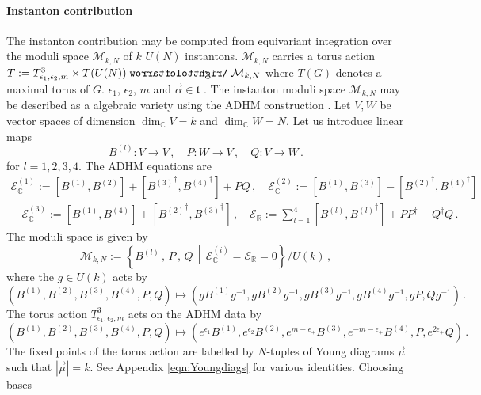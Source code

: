\documentclass[main.tex]{subfiles}
\begin{document}
\paragraph{Instanton contribution}
The instanton contribution may be computed from equivariant integration over the moduli space $\mathcal{M}_{k,N}$ of $k$ $U(N)$ instantons. 
$\mathcal{M}_{k,N}$ carries a torus action $T:=T^3_{\epsilon_1,\epsilon_2,m}\times T(U(N))\acts \mathcal{M}_{k,N}$ where $T(G)$ denotes a maximal torus of $G$. $\epsilon_1$, $\epsilon_2$, $m$ and $\vec{\alpha}\in\mathfrak{t}$ . 
The instanton moduli space $\mathcal{M}_{k,N}$ may be described as a algebraic variety using the ADHM construction \cite{Atiyah:1978ri}. Let $V,W$ be vector spaces of dimension $\dim_{\mathbb{C}}V=k$ and $\dim_{\mathbb{C}}W=N$. Let us introduce linear maps \begin{equation}
B^{(l)}:V\to V\,,\quad P:W\to V\,,\quad Q:V\to W\,.
\end{equation}
for $l=1,2,3,4$. The ADHM equations are
\begin{gather}
\mathcal{E}^{(1)}_{\mathbb{C}}:=[B^{(1)},B^{(2)}]+[{B^{(3)}}^{\dagger},{B^{(4)}}^{\dagger}]+PQ\,,\quad\mathcal{E}^{(2)}_{\mathbb{C}}:=[B^{(1)},B^{(3)}]-[{B^{(2)}}^{\dagger},{B^{(4)}}^{\dagger}]\label{eqn:ADHM1}\\
\quad\mathcal{E}^{(3)}_{\mathbb{C}}:=[B^{(1)},B^{(4)}]+[{B^{(2)}}^{\dagger},{B^{(3)}}^{\dagger}]\,,\quad\mathcal{E}_{\mathbb{R}}:=\sum_{l=1}^4[B^{(l)},{B^{(l)}}^{\dagger}]+PP^{\dagger}-Q^{\dagger}Q\,.\label{eqn:ADHM2}
\end{gather}
The moduli space is given by
\begin{equation}
\mathcal{M}_{k,N}:=\left\{B^{(l)}\,,\,P\,,\,Q\,\middle|\,\mathcal{E}_{\mathbb{C}}^{(i)}=\mathcal{E}_{\mathbb{R}}=0\right\}\slash U(k)\,,
\end{equation}
where the $g\in U(k)$ acts by
\begin{equation}\label{eqn:Ukaction}
\left(B^{(1)},B^{(2)},B^{(3)},B^{(4)},P,Q\right)\mapsto\left(gB^{(1)}g^{-1},gB^{(2)}g^{-1},gB^{(3)}g^{-1},gB^{(4)}g^{-1},gP,Qg^{-1}\right)\,.
\end{equation}
The torus action $T^3_{\epsilon_1,\epsilon_2,m}$ acts on the ADHM data by
\begin{equation}
\left(B^{(1)},B^{(2)},B^{(3)},B^{(4)},P,Q\right)\mapsto(e^{\epsilon_1} B^{(1)},e^{\epsilon_2} B^{(2)},e^{m-\epsilon_+}B^{(3)},e^{-m-\epsilon_+}B^{(4)},P,e^{2\epsilon_+}Q)\,.
\end{equation}
The fixed points of the torus action are labelled by $N$-tuples of Young diagrams $\vec{\mu}$ such that $|\vec{\mu}|=k$. See Appendix \ref{eqn:Youngdiags} for various identities. Choosing bases
\end{document}
